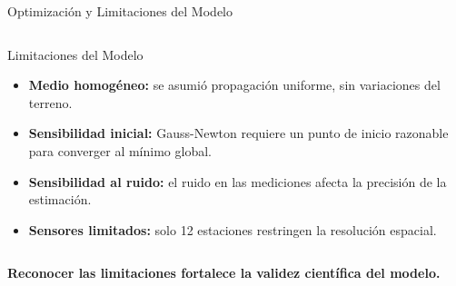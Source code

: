\begin{frame}{Optimización y Limitaciones del Modelo}
\begin{columns}[T]
        \begin{block}{Limitaciones del Modelo}
            \scriptsize
            \begin{itemize}
                \item \textbf{Medio homogéneo:} se asumió propagación uniforme, sin variaciones del terreno.
                \vspace{0.1cm}
                \item \textbf{Sensibilidad inicial:} Gauss-Newton requiere un punto de inicio razonable para converger al mínimo global.
                \vspace{0.1cm}
                \item \textbf{Sensibilidad al ruido:} el ruido en las mediciones afecta la precisión de la estimación.
                \vspace{0.1cm}
                \item \textbf{Sensores limitados:} solo 12 estaciones restringen la resolución espacial.
            \end{itemize}
        \end{block}

    \end{columns}

    \vspace{0.15cm}
    \begin{center}
        \footnotesize
        \textbf{Reconocer las limitaciones fortalece la validez científica del modelo.}
    \end{center}

\end{frame}